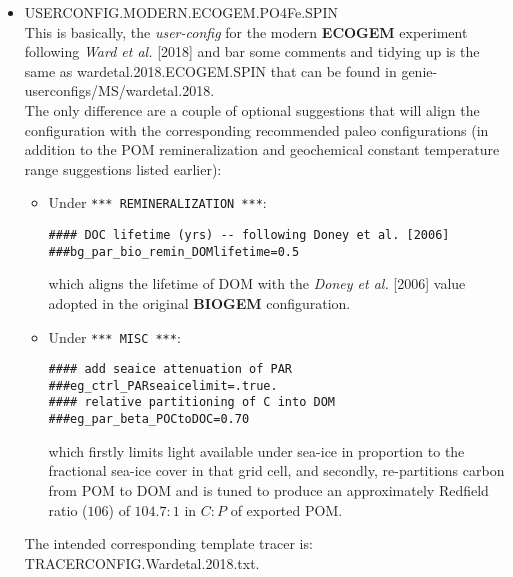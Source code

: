 \documentclass[11pt,fleqn]{book} %
\begin{document}
\begin{itemize}[noitemsep]
\vspace{2mm}
\item \textsf{\small USERCONFIG.MODERN.ECOGEM.PO4Fe.SPIN}
\vspace{1mm}
\\This is basically, the \textit{user-config} for the modern \textbf{ECOGEM} experiment following \textit{Ward et al.} [2018] and bar some comments and tidying up is the same as \textsf{\footnotesize wardetal.2018.ECOGEM.SPIN} that can be found in \textsf{\footnotesize genie-userconfigs/MS/wardetal.2018}.
\\The only difference are a couple of optional suggestions that will align the configuration with the corresponding recommended paleo configurations (in addition to the POM remineralization and geochemical constant temperature range suggestions listed earlier):
\vspace{1mm}
\begin{itemize}[noitemsep]
\item Under \texttt{*** REMINERALIZATION ***}:
\small\vspace{-1mm}\begin{verbatim}
#### DOC lifetime (yrs) -- following Doney et al. [2006]
###bg_par_bio_remin_DOMlifetime=0.5
\end{verbatim}\vspace{-1mm}\normalsize
which aligns the lifetime of DOM with the \textit{Doney et al.} [2006] value adopted in the original \textbf{BIOGEM} configuration.
\vspace{1mm}
\item Under \texttt{*** MISC ***}:
\small\vspace{-1mm}\begin{verbatim}
#### add seaice attenuation of PAR
###eg_ctrl_PARseaicelimit=.true.
#### relative partitioning of C into DOM
###eg_par_beta_POCtoDOC=0.70
\end{verbatim}\vspace{-1mm}\normalsize
which firstly limits light available under sea-ice in proportion to the fractional sea-ice cover in that grid cell, and secondly, re-partitions carbon from POM to DOM and is tuned to produce an approximately Redfield ratio (\(106\)) of \(104.7:1\) in \(C:P\) of exported POM.
\end{itemize}
The intended corresponding template tracer is: \textsf{\footnotesize TRACERCONFIG.Wardetal.2018.txt}.


\end{itemize}
\end{document}
